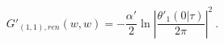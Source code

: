 \begin{equation}
  G'_{(1,1),ren}(w,w)= -\frac{\alpha'}{2}\ln \left| \frac{\theta'_1(0|\tau )}
  {2\pi} \right|^2 \ .
\label{g11ren}
\end{equation}

